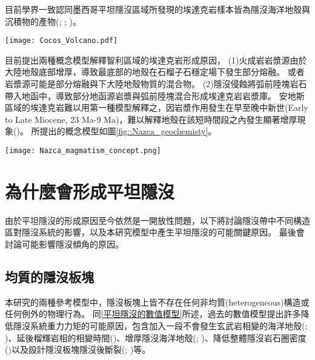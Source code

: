 目前學界一致認同墨西哥平坦隱沒區域所發現的埃達克岩樣本皆為隱沒海洋地殼與沉積物的產物(\citealp{Gutscher2000Bcan}; \citealp{ferrari2012dynamic}; \citealp{Manea2017})。

\begin{figure*}[ht!]
    \centering
    \texttt{[image: Cocos\_Volcano.pdf]}
    \caption[墨西哥區域火山島弧地球化學分析，摘自\citealp{ferrari2012dynamic}]{
    }
    \label{fig::Cocos_geochemisty}
\end{figure*}



目前提出兩種概念模型解釋智利區域的埃達克岩形成原因，
(1)火成岩岩漿源由於大陸地殼底部增厚，導致最底部的地殼在石榴子石穩定場下發生部分熔融。
或者岩漿源可能是部分熔融與下大陸地殼物質的混合物。
(2)隱沒侵蝕將弧前陸塊岩石帶入地函中，導致部分地函源岩漿與弧前陸塊混合形成埃達克岩岩漿庫。
安地斯區域的埃達克岩難以用第一種模型解釋之，因岩漿作用發生在早至晚中新世(Early to Late Miocene, 23 Ma-9 Ma)，難以解釋地殼在該短時間段之內發生顯著增厚現象(\citealp{kay2002magmatism})。
\citealp{kay2002magmatism}所提出的概念模型如圖\ref{fig::Nazca_geochemisty}。

\begin{figure*}[h!]
    \centering
    \texttt{[image: Nazca\_magmatism\_concept.png]}
    \caption[智利平坦隱沒區域岩漿活動概念模型]{智利平坦隱沒區域岩漿活動概念模型，摘自\citealp{kay2002magmatism}
    }
    \label{fig::Nazca_geochemisty}
\end{figure*}

\section{為什麼會形成平坦隱沒}
由於平坦隱沒的形成原因至今依然是一開放性問題，以下將討論隱沒帶中不同構造區對隱沒系統的影響，以及本研究模型中產生平坦隱沒的可能關鍵原因。
最後會討論可能影響隱沒傾角的原因。
\subsection{均質的隱沒板塊}
本研究的兩種參考模型中，隱沒板塊上皆不存在任何非均質(heterogeneous)構造或任何例外的物理行為。
同\ref{平坦隱沒的數值模型}所述，過去的數值模型提出許多降低隱沒系統重力力矩的可能原因，包含加入一段不會發生玄武岩相變的海洋地殼(\citealp{Liu2016}; \citealp{Gerya2009})、延後榴輝岩相的相變時間(\citealp{van2002role})、增厚隱沒海洋地殼(\citealp{Liu2016}; \citealp{axen2018basal})、降低整體隱沒岩石圈密度(\citealp{Gerya2009})以及設計隱沒板塊隱沒後斷裂(\citealp{Liu2016}; \citealp{axen2018basal})等。

